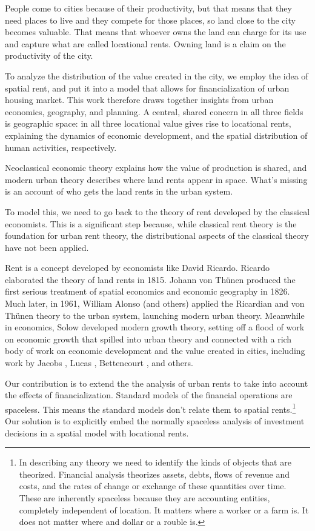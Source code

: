 People come to cities because of their productivity, but that means that they need places to live and they compete for those places, so land close to the city becomes valuable. That means that whoever owns the land can charge for its use and capture what are called \glspl{locational rent}. Owning land is a claim on the productivity of the city. 

To analyze the distribution of the value created in the city, we employ the idea of spatial rent, and put it into a model that allows for financialization of urban housing market. This work therefore draws together insights from urban economics, geography, and planning. A central, shared concern in all three fields is geographic space: in all three locational value gives rise to locational rents,  explaining the dynamics of economic development, and the spatial distribution of human activities,  respectively. 

Neoclassical economic theory explains how the value of production is shared, and
modern urban theory describes where land rents appear in space. What's missing is an account of who gets the land rents in the urban system. 

To model this, we need to go back to the theory of rent developed by the classical economists. This is a significant step because, while classical rent theory is the foundation for urban rent theory, the distributional aspects of the classical theory have not been applied.

Rent is a concept developed by economists like David Ricardo.  Ricardo \cite{ricardoEssayInfluenceLow1815} elaborated the theory of land rents in 1815. Johann von Th\"unen \cite{vonthunenIsolirteStaatBeziehung1826} produced the first serious treatment of spatial economics and economic geography in 1826. Much later, in 1961, William Alonso (and others) \cite{alonsoModelUrbanLand1960} applied the Ricardian and von Th\"unen theory to the urban system, launching modern urban theory. Meanwhile in economics, Solow \cite{solowContributionTheoryEconomic1956} developed modern growth theory, setting off a flood of work on economic growth that spilled into urban theory and connected with a rich body of work on economic development and the value created in cities, including work by Jacobs \cite{jacobsEconomyCities1969}, Lucas \cite{lucasMechanicsEconomicDevelopment1988}, Bettencourt \cite{bettencourtGrowthInnovationScaling2007}, and others. 

Our contribution is to extend the the analysis of urban rents to take into account the effects of financialization. Standard models of the financial operations are spaceless. This means the standard models don't relate them to spatial rents.\footnote{In describing any theory we need to identify the kinds of objects that are theorized. Financial analysis theorizes  assets, debts, flows of revenue and costs, and the rates of change or exchange of these quantities over time. These are inherently spaceless because they are accounting entities, completely independent of location. It matters where a worker or a farm is. It does not matter where and dollar or a rouble is.} Our solution is to explicitly embed the normally spaceless analysis of investment decisions in a spatial model with locational rents.

